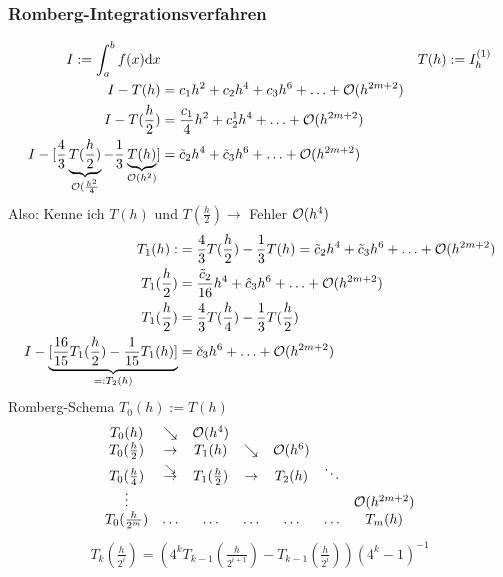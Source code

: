 \subsubsection{Romberg-Integrationsverfahren}
\begin{align*}
  I := \int_a^b f(x) \mathrm{d}x && T(h) := I_h^{(1)}\\
  I-T(h) &= c_1h^2 + c_2h^4+c_3h^6+\ldots+\mathcal{O}(h^{2m+2})\\
  I-T(\frac{h}{2}) &= \frac{c_1}{4} h^2 + c_2^1h^4+\ldots+\mathcal{O}(h^{2m+2})\\
  I-[\frac{4}{3} \underbrace{T(\frac{h}{2})}_{\mathcal{O}(\frac{h^2}{4}} - \frac{1}{3} \underbrace{T(h)}_{\mathcal{O}(h^2)} ] &= \tilde{c}_2h^4 + \tilde{c}_3h^6 + \ldots + \mathcal{O}(h^{2m+2})
\end{align*}
Also: Kenne ich $T(h)$ und $T(\frac{h}{2})\rightarrow$ Fehler $\mathcal{O}(h^4)$
\begin{align*}
  T_1(h) :&= \frac{4}{3} T(\frac{h}{2}) - \frac{1}{3} T(h) = \tilde{c}_2h^4 + \tilde{c}_3h^6 + \ldots + \mathcal{O}(h^{2m+2})\\
  T_1(\frac{h}{2}) &= \frac{\tilde{c}_2}{16} h^4 + \hat{c}_3 h^6 + \ldots + \mathcal{O}(h^{2m+2})\\
  T_1(\frac{h}{2}) &= \frac{4}{3} T(\frac{h}{4}) - \frac{1}{3} T(\frac{h}{2})\\
  I-\underbrace{[\frac{16}{15} T_1(\frac{h}{2}) - \frac{1}{15} T_1(h)]}_{=: T_2(h)} &= \breve{c}_3 h^6 + \ldots + \mathcal{O}(h^{2m+2})
\end{align*}
Romberg-Schema $T_0(h) := T(h)$
\begin{align*}
  \begin{matrix}
    T_0(h)                & \searrow    & \LandauO(h^4)    &             &               &           &\\
    T_0(\frac{h}{2})      & \rightarrow & T_1(h)           & \searrow    & \LandauO(h^6) &           &\\
    T_0(\frac{h}{4})      & \esearrow & T_1(\frac{h}{2}) & \rightarrow & T_2(h)        &  \ddots     &\\
    \vdots                &             &                  &             &               &           & \LandauO(h^{2m+2})\\
    T_0(\frac{h}{2^m})    & \ldots      & \ldots           & \ldots      &      \ldots   &  \ldots   & T_m(h) \\ %
  \end{matrix}
\end{align*}
\begin{align*}
  T_k\left(\frac{h}{2^i}\right) = \left( 4^k T_{k-1}\left(\frac{h}{2^{i+1}} \right) - T_{k-1}\left(\frac{h}{2^i} \right) \right) \left(4^k-1\right)^{-1}
\end{align*}
